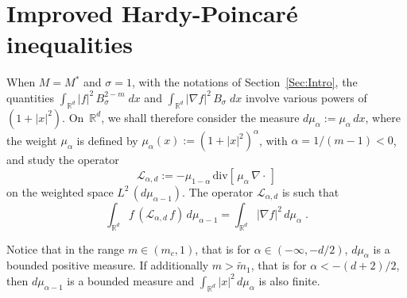 \section{Improved Hardy-Poincar\'e inequalities}\label{Sec:HardyPoincare}

When $M=M^*$ and $\sigma=1$, with the notations of Section~\ref{Sec:Intro}, the quantities $\int_{{{\mathbb R}}^d}|f|^2\,B_\sigma^{2-m}\;dx$ and
$\int_{{{\mathbb R}}^d}|\nabla f|^2\,B_\sigma\;dx$ involve various powers of $(1+|x|^2)$. On~${{\mathbb R}}^d$, we shall therefore consider the measure
$d\mu_\alpha:={\mu}_\alpha\,dx$, where the weight ${\mu}_\alpha$ is defined by ${\mu}_\alpha(x):= (1+|x|^2)^{\alpha}$, with $\alpha=1/(m-1)<0$, and study the
operator
\[
\mathcal L_{\alpha,d}:=-{\mu}_{1-\alpha}\,\mathrm{div}\left[\,{\mu}_\alpha\,\nabla\cdot\,\right]
\]
on the weighted space $L^2\,(d\mu_{\alpha-1})$. The operator $\mathcal L_{\alpha,d}$ is such that
\[
\int_{{{\mathbb R}}^d}f\,(\mathcal L_{\alpha,d}\,f)\,d\mu_{\alpha-1}=\int_{{{\mathbb R}}^d}|\nabla f|^2\,d\mu_\alpha\;.
\]

Notice that in the range $m\in(m_c,1)$, that is for $\alpha\in(-\infty,-d/2)$, $d\mu_\alpha$ is a bounded positive measure. If additionally
$m>\widetilde m_1$, that is for $\alpha<-(d+2)/2$, then $d\mu_{\alpha-1}$ is a bounded measure and $\int_{{{\mathbb R}}^d}|x|^2\,d\mu_\alpha$ is also finite.


